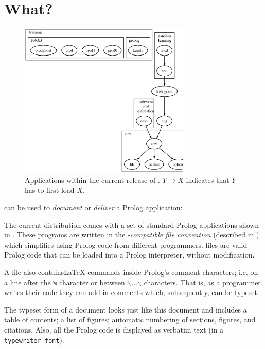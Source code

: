 \section{What?}

\begin{figure}[!b]
\begin{center}
\includegraphics[width=3.2in]{prod.eps}
\end{center}
\caption[Applications within the current release of
{\PROD}]{Applications within the current release of {\PROD}. $Y
\rightarrow X$ indicates that $Y$ has to first load
$X$.}\label{fig:components}
\end{figure}


 {\PROD} can be used to
  {\em document} or {\em deliver}
 a Prolog application:

 \bd
 \item[Delivery:]
 The current {\PROD} distribution comes with a set of standard Prolog applications
  shown
in . These programs are written in
the {\em {\PROD}-compatible file convention} (described in )
which
 simplifies using
Prolog code from different programmers. {\PROD} files are valid
Prolog code that can be loaded into a Prolog interpreter, without
modification.
 \item[Documentation:]A {\PROD} file also
  contains{\LaTeX} commands inside Prolog's comment
characters; i.e. on a line after the {\tt \%} character or between
 {$\backslash$}{\tt *}...{\tt *}{$\backslash$} characters.
 That is, as a programmer
 writes their code  they can add in comments which,
 subsequently, can be typeset.
\ed

The typeset form of a {\PROD} document looks just like this
document and includes a table of contents; a list of figures;
automatic numbering of sections, figures, and citations. Also, all
the Prolog code is displayed as verbatim text (in a {\tt
typewriter font}).

